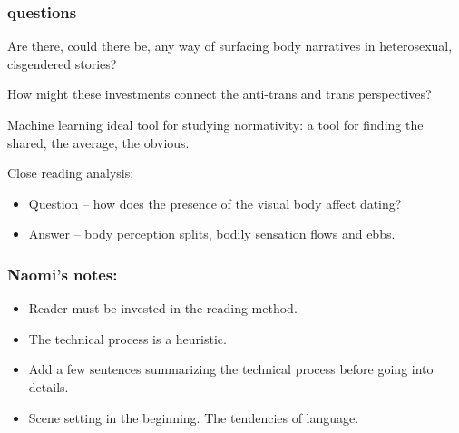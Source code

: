\documentclass[11pt]{article}
\begin{document}
\subsubsection{questions}
\label{sec:org1a14417}
Are there, could there be, any way of surfacing body narratives in
heterosexual, cisgendered stories?

How might these investments connect the anti-trans and trans
perspectives?

Machine learning ideal tool for studying normativity: a tool for
finding the shared, the average, the obvious.

Close reading analysis:
\begin{itemize}
\item Question -- how does the presence of the visual body affect dating?
\item Answer -- body perception splits, bodily sensation flows and ebbs.
\end{itemize}

\subsubsection{Naomi's notes:}
\label{sec:org3b5bed0}
\begin{itemize}
\item Reader must be invested in the reading method.
\item The technical process is a heuristic.
\item Add a few sentences summarizing the technical process before going
into details.
\item Scene setting in the beginning. The tendencies of language.
\end{itemize}
\end{document}
